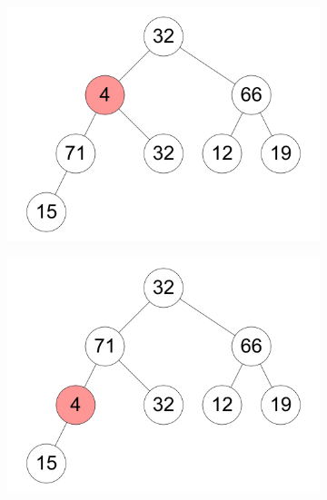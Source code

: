 \documentclass[11pt,a4paper]{article}
\begin{document}
\begin{loesung}
\begin{enumerate}
\begin{figure}[h!]
\begin{subfigure}[b]{0.23\textwidth}
                \includegraphics[width=\textwidth]{img/a5}
            \end{subfigure}
            \begin{subfigure}[b]{0.23\textwidth}
                \centering
                \includegraphics[width=\textwidth]{img/a6}
            \end{subfigure}
            \begin{subfigure}[b]{0.23\textwidth}
                \centering

\end{subfigure}
\end{figure}
\end{enumerate}
\end{loesung}
\end{document}
